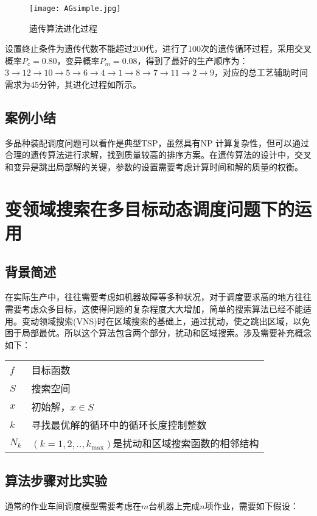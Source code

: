 \begin{figure}[h]
\centering
\texttt{[image: AGsimple.jpg]}
\caption{遗传算法进化过程\label{fig:AGsimple}}
\end{figure}

设置终止条件为遗传代数不能超过200代，进行了100次的遗传循环过程，采用交叉概率$P_c = 0.80$，变异概率$P_m = 0.08$，得到了最好的生产顺序为：$3\rightarrow12\rightarrow10\rightarrow5\rightarrow6\rightarrow4\rightarrow1\rightarrow8\rightarrow7\rightarrow11\rightarrow2\rightarrow9$，对应的总工艺辅助时间需求为45分钟，其进化过程如所示。

\subsection{案例小结}
多品种装配调度问题可以看作是典型TSP，虽然具有NP 计算复杂性，但可以通过合理的遗传算法进行求解，找到质量较高的排序方案。在遗传算法的设计中，交叉和变异是跳出局部解的关键，参数的设置需要考虑计算时间和解的质量的权衡。

\section{变领域搜索在多目标动态调度问题下的运用}
\subsection{背景简述}
在实际生产中，往往需要考虑如机器故障等多种状况，对于调度要求高的地方往往需要考虑众多目标，这使得问题的复杂程度大大增加，简单的搜索算法已经不能适用。变动领域搜索(VNS)时在区域搜索的基础上，通过扰动，使之跳出区域，以免困于局部最优。所以这个算法包含两个部分，扰动和区域搜索。涉及需要补充概念如下：

\begin{tabular}{ll}
$f$ & 目标函数\\
$S$ & 搜索空间 \\
$x$ & 初始解，$x\in S$\\
$k$ & 寻找最优解的循环中的循环长度控制整数\\
$N_k$ & $(k = 1,2,..,k_{\max})$是扰动和区域搜索函数的相邻结构
\end{tabular}

\subsection{算法步骤对比实验}
通常的作业车间调度模型需要考虑在$m$台机器上完成$n$项作业，需要如下假设：

